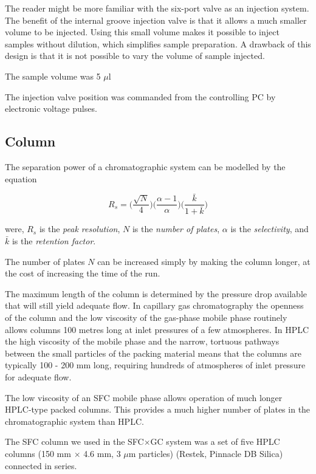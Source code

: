 The reader might be more familiar with the six-port valve as an injection
system. The benefit of the internal groove injection valve is that it allows a
much smaller volume to be injected. Using this small volume makes it possible to
inject samples without dilution, which simplifies sample preparation. A drawback
of this design is that it is not possible to vary the volume of sample injected.

The sample volume was 5 $\mu$l

The injection valve position was commanded from the controlling PC by electronic
voltage pulses.

\subsection{Column}

The separation power of a chromatographic system can be modelled by the equation 

\begin{equation}
R_s = \bigg(\frac{\sqrt{N}}{4}\bigg)  \bigg(\frac{\alpha-1}{\alpha}\bigg)  \bigg(\frac{\bar{k}}{1+\bar{k}}\bigg)
\end{equation}

were, $R_s$ is the \textit{peak resolution}, $N$ is the \textit{number of
plates}, $\alpha$ is the \textit{selectivity}, and $\bar{k}$ is the
\textit{retention factor}.
 
The number of plates $N$ can be increased simply by making the column longer,
at the cost of increasing the time of the run.

The maximum length of the column is determined by the pressure drop available
that will still yield adequate flow. In capillary gas chromatography the
openness of the column and the low viscosity of the gas-phase mobile phase
routinely allows columns 100 metres long at inlet pressures of a few
atmospheres. In HPLC the high viscosity of the mobile phase and the narrow,
tortuous pathways between the small particles of the packing material means that
the columns are typically 100 - 200 mm long, requiring hundreds of atmospheres
of inlet pressure for adequate flow.

The low viscosity of an SFC mobile phase allows operation of much longer
HPLC-type packed columns. This provides a much higher number of plates in the
chromatographic system than HPLC.

The SFC column we used in the SFC×GC system was a set of five HPLC columns (150
mm $\times$ 4.6 mm, 3 $\mu$m particles) (Restek, Pinnacle DB Silica) connected
in series.

